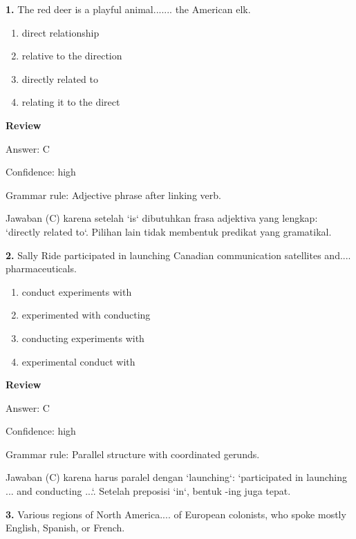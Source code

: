 \documentclass[12pt]{article}
\begin{document}
\noindent\textbf{1.} The red deer is a playful animal....... the American elk.
\begin{enumerate}[label=(\Alph*),leftmargin=*,itemsep=0.2em]
\item direct relationship
\item relative to the direction
\item directly related to
\item relating it to the direct
\end{enumerate}
\par
\begingroup
\setlength{\parskip}{0pt}
\setlength{\parindent}{0pt}
\textbf{Review}\par
Answer: C\par
Confidence: high\par
Grammar rule: Adjective phrase after linking verb.\par
Jawaban (C) karena setelah `is` dibutuhkan frasa adjektiva yang lengkap: `directly related to`. Pilihan lain tidak membentuk predikat yang gramatikal.\par
\endgroup
\par
\vspace{0.25\baselineskip}
\noindent\textbf{2.} Sally Ride participated in launching Canadian communication satellites and.... pharmaceuticals.
\begin{enumerate}[label=(\Alph*),leftmargin=*,itemsep=0.2em]
\item conduct experiments with
\item experimented with conducting
\item conducting experiments with
\item experimental conduct with
\end{enumerate}
\par
\begingroup
\setlength{\parskip}{0pt}
\setlength{\parindent}{0pt}
\textbf{Review}\par
Answer: C\par
Confidence: high\par
Grammar rule: Parallel structure with coordinated gerunds.\par
Jawaban (C) karena harus paralel dengan `launching`: `participated in launching ... and conducting ...`. Setelah preposisi `in`, bentuk -ing juga tepat.\par
\endgroup
\par
\vspace{0.25\baselineskip}
\noindent\textbf{3.} Various regions of North America.... of European colonists, who spoke mostly English, Spanish, or French.
\end{document}
